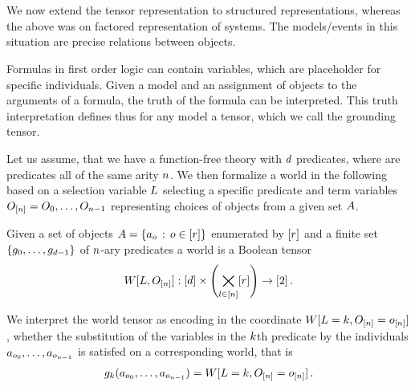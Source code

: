 \chapter{\chatextfolModels}\label{cha:folModels}

We now extend the tensor representation to structured representations, whereas the above was on factored representation of systems.
The models/events in this situation are precise relations between objects.





%


Formulas in first order logic can contain variables, which are placeholder for specific individuals.
Given a model and an assignment of objects to the arguments of a formula, the truth of the formula can be interpreted.
This truth interpretation defines thus for any model a tensor, which we call the grounding tensor.

Let us assume, that we have a function-free theory with $d$ predicates, where are predicates all of the same arity $n$.
We then formalize a world in the following based on a selection variable $L$ selecting a specific predicate and term variables $O_{[n]}=O_{0},\ldots,O_{n-1}$ representing choices of objects from a given set $A$.

\begin{definition}
	Given a set of objects $A=\{a_{o} \, : \, o\in[r]\}$ enumerated by $[r]$ and a finite set $\{g_{0},\ldots,g_{d-1}\}$ of $n$-ary predicates a world is a Boolean tensor
	\begin{align}
		W[L,O_{[n]}] : [d] \times \left( \bigtimes_{l\in[n]} [r] \right) \rightarrow [2] \, . 
	\end{align}
	
	We interpret the world tensor as encoding in the coordinate $W[L=k,O_{[n]}=o_{[n]}]$, whether the substitution of the variables in the $k$th predicate by the individuals $a_{o_{0}},\ldots,a_{o_{n-1}}$ is satisfed on a corresponding world, that is
	\begin{align*}
		g_{k}(a_{o_{0}},\ldots,a_{o_{n-1}}) = W[L=k,O_{[n]}=o_{[n]}] \, . 
	\end{align*}
\end{definition}


